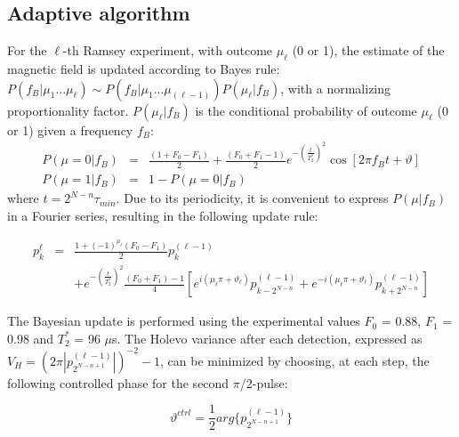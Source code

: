 \subsection{Adaptive algorithm}
For the $\ell$-th Ramsey experiment, with outcome $\mu_{\ell}$ (0 or 1), the estimate of the magnetic field is updated according to Bayes rule: $P(f_B | \mu_{1}...\mu_{\ell})\sim P(f_B | \mu_{1} ... \mu_{(\ell-1)}) P(\mu_{\ell} | f_B )$, with a normalizing proportionality factor. $P(\mu_\ell |f_B)$ is the conditional probability of outcome $\mu_\ell$ (0 or 1) given a frequency $f_B$:
\begin{eqnarray*}
P(\mu = 0 | f_B ) &=& \frac{(1+F_0-F_1)}{2} + \frac{(F_0+F_1-1)}{2}  e^{-(\frac{t}{T_{2}^{*}})^{2}} \cos [ 2\pi f_B t + \vartheta ] \\
P(\mu = 1 | f_B) &=& 1 - P(\mu = 0 | f_B)
\end{eqnarray*}
where $t = 2^{N-n} \tau_{min}$. Due to its periodicity, it is convenient to express $P(\mu | f_B)$ in a Fourier series, resulting in the following update rule:

\begin{eqnarray*}
p_k^{\ell} &=& \frac{1 + (-1)^{\mu_{\ell}} (F_{0}-F_{1})} {2} p_{k}^{(\ell - 1)} \\
& & + e^{-(\frac{t}{T_{2}^{*}})^{2}} \frac{(F_{0} + F_{1}) - 1}{4} \left[ e^{i(\mu_{\ell}\pi + \vartheta_{\ell})} p_{k-2^{N-n}}^{(\ell - 1)} + e^{-i(\mu_{\ell}\pi + \vartheta_{\ell})} p_{k + 2^{N-n}}^{(\ell - 1)} \right] \nonumber
\end{eqnarray*}

The Bayesian update is performed using the experimental values $F_{0}$ = 0.88, $F_{1}$ = 0.98 and $T_2^*$ = 96 $\mu$s.
The Holevo variance after each detection, expressed as  $V_H = (2 \pi | p_{2^{N-n+1}}^{(\ell - 1)}|)^{-2}-1$, can be minimized by choosing, at each step, the following controlled phase for the second $\pi$/2-pulse\cite{Cappellaro_Phys.Rev.A_2012}:

\begin{equation}
\vartheta^{ctrl} = \frac{1}{2}  arg \{ p_{2^{N-n+1}} ^{(\ell - 1)} \}
\end{equation}

